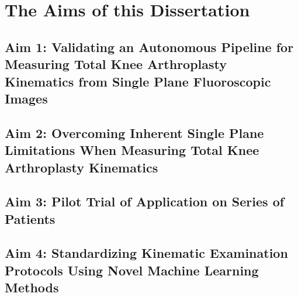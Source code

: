 \chapter{The Aims of this Dissertation}
\label{sec:aims}

\section{Aim 1: Validating an Autonomous Pipeline for Measuring Total Knee Arthroplasty Kinematics from Single Plane Fluoroscopic Images}
\label{sec:aim1}


\section{Aim 2: Overcoming Inherent Single Plane Limitations When Measuring Total Knee Arthroplasty Kinematics}
\label{sec:aim2}


\section{Aim 3: Pilot Trial of Application on Series of Patients}
\label{sec:aim3}


\section{Aim 4: Standardizing Kinematic Examination Protocols Using Novel Machine Learning Methods}
\label{sec:aim4}
